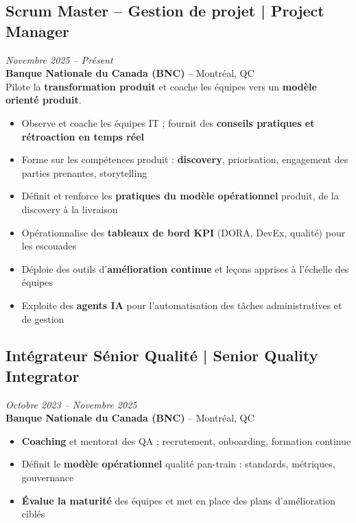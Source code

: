 \documentclass[11pt,a4paper]{article}
\begin{document}
\subsection*{Scrum Master -- Gestion de projet | Project Manager} \hfill \textit{Novembre 2025 -- Présent}\\
\textbf{Banque Nationale du Canada (BNC)} -- Montréal, QC\\
Pilote la \textbf{transformation produit} et coache les équipes vers un \textbf{modèle orienté produit}.
\begin{itemize}
    \item Observe et coache les équipes IT ; fournit des \textbf{conseils pratiques et rétroaction en temps réel}
    \item Forme sur les compétences produit : \textbf{discovery}, priorisation, engagement des parties prenantes, storytelling
    \item Définit et renforce les \textbf{pratiques du modèle opérationnel} produit, de la discovery à la livraison
    \item Opérationnalise des \textbf{tableaux de bord KPI} (DORA, DevEx, qualité) pour les escouades
    \item Déploie des outils d'\textbf{amélioration continue} et leçons apprises à l'échelle des équipes
    \item Exploite des \textbf{agents IA} pour l'automatisation des tâches administratives et de gestion
\end{itemize}

\subsection*{Intégrateur Sénior Qualité | Senior Quality Integrator} \hfill \textit{Octobre 2023 -- Novembre 2025}\\
\textbf{Banque Nationale du Canada (BNC)} -- Montréal, QC\\
\begin{itemize}
    \item \textbf{Coaching} et mentorat des QA ; recrutement, onboarding, formation continue
    \item Définit le \textbf{modèle opérationnel} qualité pan-train : standards, métriques, gouvernance
    \item \textbf{Évalue la maturité} des équipes et met en place des plans d'amélioration ciblés
\end{itemize}
\end{document}
